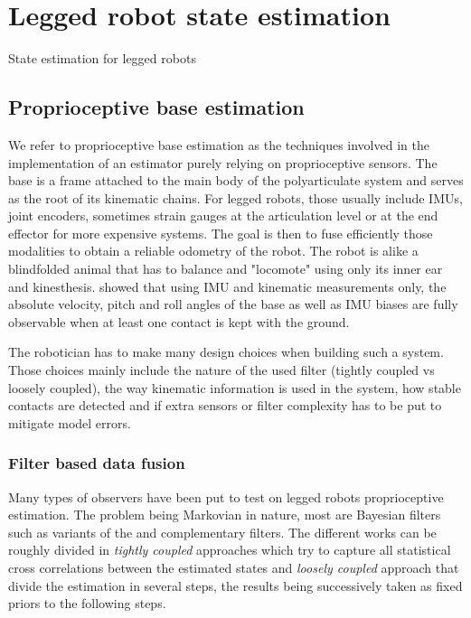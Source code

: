\chapter{Legged robot state estimation}
State estimation for legged robots 


\section{Proprioceptive base estimation}
 We refer to proprioceptive base estimation as the techniques involved in the implementation of an estimator purely relying
 on proprioceptive sensors. The base is a frame attached to the main body of the polyarticulate system and serves
 as the root of its kinematic chains. For legged robots, those usually include IMUs, joint encoders, sometimes strain gauges at the 
 articulation level or at the end effector for more expensive systems. The goal is then to fuse efficiently those 
 modalities to obtain a reliable odometry of the robot. The robot is alike a blindfolded animal that has to balance and "locomote" using 
 only its inner ear and kinesthesis. \cite{bloesch2013state,rotella2014state} showed that using IMU and kinematic measurements 
 only, the absolute velocity, pitch and roll angles of the base as well as IMU biases are fully observable when at least one contact 
 is kept with the ground.

 The robotician has to make many design choices when building such a system. Those choices mainly include the nature of the used filter (tightly coupled vs loosely coupled), 
 the way kinematic information is used in the system, how stable contacts are detected and if extra sensors or filter complexity
 has to be put to mitigate model errors.
 

\subsection{Filter based data fusion}
Many types of observers have been put to test on legged robots proprioceptive estimation. The problem being Markovian in nature,
most are Bayesian filters such as variants of the \KalmanF \cite{kalman1960new} and complementary filters. The different works can be 
roughly divided in \textit{tightly coupled} approaches which try to capture all statistical cross correlations between the estimated states
and \textit{loosely coupled} approach that divide the estimation in several steps, the results being successively taken as fixed priors to the 
following steps.


